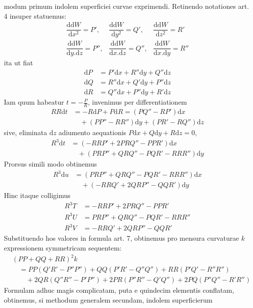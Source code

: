 %
modum primum indolem superficiei curvae exprimendi. Retinendo notationes art. 4 insuper statuemus:
\[
\begin{array}{lll}
\dfrac{\mathrm{d}\mathrm{d}W}{\mathrm{d}x^2}=P',&\dfrac{\mathrm{d}\mathrm{d}W}{\mathrm{d}y^2}=Q',&\dfrac{\mathrm{d}\mathrm{d}W}{\mathrm{d}z^2}=R'\\[6pt]
\dfrac{\mathrm{d}\mathrm{d}W}{\mathrm{d}y\mathord{.}\mathrm{d}z}=P'',&\dfrac{\mathrm{d}\mathrm{d}W}{\mathrm{d}x\mathord{.}\mathrm{d}z}=Q'',&\dfrac{\mathrm{d}\mathrm{d}W}{\mathrm{d}x\mathord{.}\mathrm{d}y}=R''
\end{array}
\]
ita ut fiat
\[
\begin{aligned}
\mathrm{d}P&=P'\mathrm{d}x+R''\mathrm{d}y+Q''\mathrm{d}z\\
\mathrm{d}Q&=R''\mathrm{d}x+Q'\mathrm{d}y+P''\mathrm{d}z\\
\mathrm{d}R&=Q''\mathrm{d}x+P''\mathrm{d}y+R'\mathrm{d}z
\end{aligned}
\]
Iam quum habeatur \(t=-\frac{P}{R}\), invenimus per differentiationem
\[
\begin{aligned}
RR\mathrm{d}t&=-R\mathrm{d}P+P\mathrm{d}R=(PQ''-RP')\mathrm{d}x\\
&\quad +(PP''-RR'')\mathrm{d}y+(PR'-RQ'')\mathrm{d}z
\end{aligned}
\]
sive, eliminata \(\mathrm{d}z\) adiumento aequationis \(P\mathrm{d}x+Q\mathrm{d}y+R\mathrm{d}z=0\),
\[
\begin{aligned}
R^3\mathrm{d}t&=(-RRP'+2PRQ''-PPR')\mathrm{d}x\\
&\quad +(PRP''+QRQ''-PQR'-RRR'')\mathrm{d}y
\end{aligned}
\]
Prorsus simili modo obtinemus
\[
\begin{aligned}
R^3\mathrm{d}u&=(PRP''+QRQ''-PQR'-RRR'')\mathrm{d}x\\
&\quad +(-RRQ'+2QRP''-QQR')\mathrm{d}y
\end{aligned}
\]
Hinc itaque colligimus
\[
\begin{aligned}
R^3T&=-RRP'+2PRQ''-PPR'\\
R^3U&=PRP''+QRQ''-PQR'-RRR''\\
R^3V&=-RRQ'+2QRP''-QQR'
\end{aligned}
\]
Substituendo hos valores in formula art. 7, obtinemus pro mensura curvaturae \(k\) expressionem symmetricam sequentem:
\[
\begin{aligned}
&(PP+QQ+RR)^2k\\
&\quad=PP(Q'R'-P''P'')+QQ(P'R'-Q''Q'')+RR(P'Q'-R''R'')\\
&\qquad+2QR(Q''R''-P'P'')+2PR(P''R''-Q'Q'')+2PQ(P''Q''-R'R'')
\end{aligned}
\]
Formulam adhuc magis complicatam, puta e quindecim elementis conflatam, obtinemus, si methodum generalem secundam, indolem superficierum
